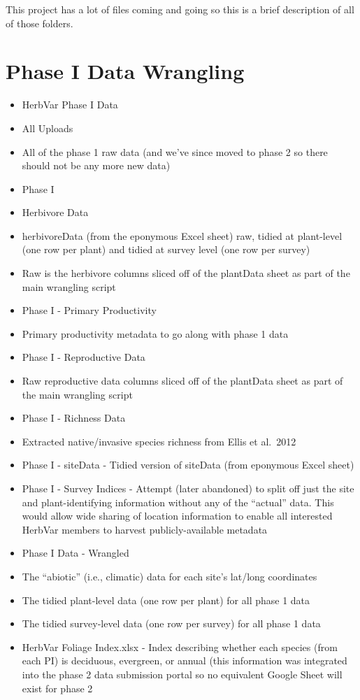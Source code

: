 \documentclass[
  letterpaper,
  DIV=11,
  numbers=noendperiod]{scrreprt}
\begin{document}
This project has a lot of files coming and going so this is a brief
description of all of those folders.

\section{Phase I Data Wrangling}\label{phase-i-data-wrangling}

\begin{itemize}
\item
  HerbVar Phase I Data
\item
  All Uploads
\item
  All of the phase 1 raw data (and we've since moved to phase 2 so there
  should not be any more new data)
\item
  Phase I
\item
  Herbivore Data
\item
  herbivoreData (from the eponymous Excel sheet) raw, tidied at
  plant-level (one row per plant) and tidied at survey level (one row
  per survey)
\item
  Raw is the herbivore columns sliced off of the plantData sheet as part
  of the main wrangling script
\item
  Phase I - Primary Productivity
\item
  Primary productivity metadata to go along with phase 1 data
\item
  Phase I - Reproductive Data
\item
  Raw reproductive data columns sliced off of the plantData sheet as
  part of the main wrangling script
\item
  Phase I - Richness Data
\item
  Extracted native/invasive species richness from Ellis et al.~2012
\item
  Phase I - siteData - Tidied version of siteData (from eponymous Excel
  sheet)
\item
  Phase I - Survey Indices - Attempt (later abandoned) to split off just
  the site and plant-identifying information without any of the
  ``actual'' data. This would allow wide sharing of location information
  to enable all interested HerbVar members to harvest publicly-available
  metadata
\item
  Phase I Data - Wrangled
\item
  The ``abiotic'' (i.e., climatic) data for each site's lat/long
  coordinates
\item
  The tidied plant-level data (one row per plant) for all phase 1 data
\item
  The tidied survey-level data (one row per survey) for all phase 1 data
\item
  HerbVar Foliage Index.xlsx - Index describing whether each species
  (from each PI) is deciduous, evergreen, or annual (this information
  was integrated into the phase 2 data submission portal so no
  equivalent Google Sheet will exist for phase 2
\end{itemize}
\end{document}
